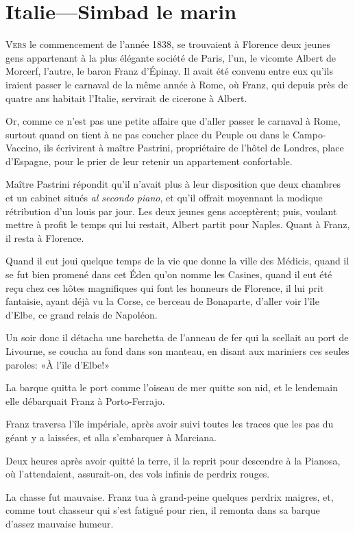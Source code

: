 \chapter{Italie—Simbad le marin}

\lettrine{V}{ers} le commencement de l'année 1838, se trouvaient à Florence deux jeunes gens appartenant à la plus élégante société de Paris, l'un, le vicomte Albert de Morcerf, l'autre, le baron Franz d'Épinay. Il avait été convenu entre eux qu'ils iraient passer le carnaval de la même année à Rome, où Franz, qui depuis près de quatre ans habitait l'Italie, servirait de cicerone à Albert.

Or, comme ce n'est pas une petite affaire que d'aller passer le carnaval à Rome, surtout quand on tient à ne pas coucher place du Peuple ou dans le Campo-Vaccino, ils écrivirent à maître Pastrini, propriétaire de l'hôtel de Londres, place d'Espagne, pour le prier de leur retenir un appartement confortable.

Maître Pastrini répondit qu'il n'avait plus à leur disposition que deux chambres et un cabinet situés \textit{al secondo piano}, et qu'il offrait moyennant la modique rétribution d'un louis par jour. Les deux jeunes gens acceptèrent; puis, voulant mettre à profit le temps qui lui restait, Albert partit pour Naples. Quant à Franz, il resta à Florence.

Quand il eut joui quelque temps de la vie que donne la ville des Médicis, quand il se fut bien promené dans cet Éden qu'on nomme les Casines, quand il eut été reçu chez ces hôtes magnifiques qui font les honneurs de Florence, il lui prit fantaisie, ayant déjà vu la Corse, ce berceau de Bonaparte, d'aller voir l'île d'Elbe, ce grand relais de Napoléon.

Un soir donc il détacha une barchetta de l'anneau de fer qui la scellait au port de Livourne, se coucha au fond dans son manteau, en disant aux mariniers ces seules paroles: «À l'île d'Elbe!»

La barque quitta le port comme l'oiseau de mer quitte son nid, et le lendemain elle débarquait Franz à Porto-Ferrajo.

Franz traversa l'île impériale, après avoir suivi toutes les traces que les pas du géant y a laissées, et alla s'embarquer à Marciana.

Deux heures après avoir quitté la terre, il la reprit pour descendre à la Pianosa, où l'attendaient, assurait-on, des vols infinis de perdrix rouges.

La chasse fut mauvaise. Franz tua à grand-peine quelques perdrix maigres, et, comme tout chasseur qui s'est fatigué pour rien, il remonta dans sa barque d'assez mauvaise humeur.

